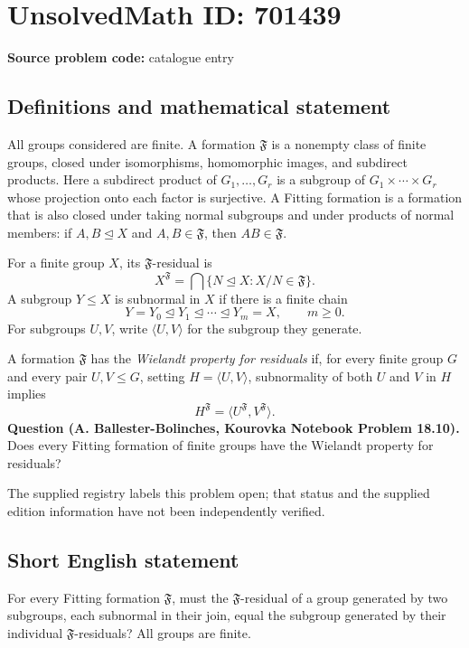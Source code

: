 \documentclass[11pt]{article}
\begin{document}
\section*{UnsolvedMath ID: 701439}
\textbf{Source problem code:} catalogue entry
\subsection{Definitions and mathematical statement}
All groups considered are finite. A formation \(\mathfrak F\) is a nonempty class of finite groups, closed under isomorphisms, homomorphic images, and subdirect products. Here a subdirect product of \(G_1,\ldots,G_r\) is a subgroup of \(G_1\times\cdots\times G_r\) whose projection onto each factor is surjective. A Fitting formation is a formation that is also closed under taking normal subgroups and under products of normal members: if \(A,B\trianglelefteq X\) and \(A,B\in\mathfrak F\), then \(AB\in\mathfrak F\).

For a finite group \(X\), its \(\mathfrak F\)-residual is
\[
X^{\mathfrak F}=\bigcap\{N\trianglelefteq X:X/N\in\mathfrak F\}.
\]
A subgroup \(Y\leq X\) is subnormal in \(X\) if there is a finite chain
\[
Y=Y_0\trianglelefteq Y_1\trianglelefteq\cdots\trianglelefteq Y_m=X,
\qquad m\geq 0.
\]
For subgroups \(U,V\), write \(\langle U,V\rangle\) for the subgroup they generate.

A formation \(\mathfrak F\) has the \emph{Wielandt property for residuals} if, for every finite group \(G\) and every pair \(U,V\leq G\), setting \(H=\langle U,V\rangle\), subnormality of both \(U\) and \(V\) in \(H\) implies
\[
H^{\mathfrak F}=\langle U^{\mathfrak F},V^{\mathfrak F}\rangle.
\]
\textbf{Question (A. Ballester-Bolinches, Kourovka Notebook Problem 18.10).} Does every Fitting formation of finite groups have the Wielandt property for residuals?

The supplied registry labels this problem open; that status and the supplied edition information have not been independently verified.
\subsection{Short English statement}
For every Fitting formation \(\mathfrak F\), must the \(\mathfrak F\)-residual of a group generated by two subgroups, each subnormal in their join, equal the subgroup generated by their individual \(\mathfrak F\)-residuals? All groups are finite.
\end{document}
